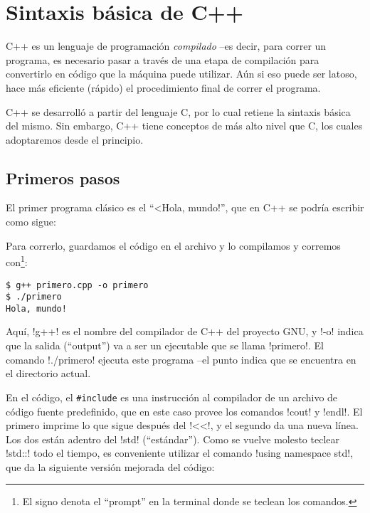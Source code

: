 \chapter{Sintaxis básica de C++}


C++ es un lenguaje de programación \emph{compilado} --es decir, para correr un
programa, es necesario pasar a través de una etapa de compilación para
convertirlo en código que la máquina puede utilizar. Aún si eso puede ser
latoso, hace más eficiente (rápido) el procedimiento final de correr el
programa. 

C++ se desarrolló a partir del lenguaje C, por lo cual retiene la sintaxis
básica del mismo. Sin embargo, C++ tiene conceptos de más alto nivel que C, 
los cuales
adoptaremos  desde el principio.

% 

\section{Primeros pasos}
El primer programa clásico es el ``<Hola, mundo!'', que en C++ se podría
escribir como sigue:

Para correrlo, guardamos el código en el archivo  y lo
compilamos y corremos con\footnote{El signo \inl{\$} denota el ``prompt''
en la terminal donde se teclean los comandos.}:
\begin{lstlisting}
$ g++ primero.cpp -o primero
$ ./primero
Hola, mundo!
\end{lstlisting}

Aquí, \inl!g++! es el nombre del compilador de C++ del proyecto GNU, y \inl!-o!
indica que la salida (``output'') va a ser un ejecutable que se llama
\inl!primero!. El comando \inl!./primero! ejecuta este programa --el punto
indica que se encuentra en el directorio actual.

En el código, el \lstinline!#include! es una instrucción al compilador de
 un archivo de código fuente predefinido, que en este caso provee
los comandos \inl!cout! y \inl!endl!. El primero imprime lo que sigue después
del \inl!<<!, y el segundo da una nueva línea.  Los dos están adentro del
 \inl!std!  (``estándar''). Como se vuelve molesto
teclear \inl!std::! todo el tiempo, es conveniente utilizar el comando
\inl!using namespace std!, que da la siguiente versión mejorada del código:

